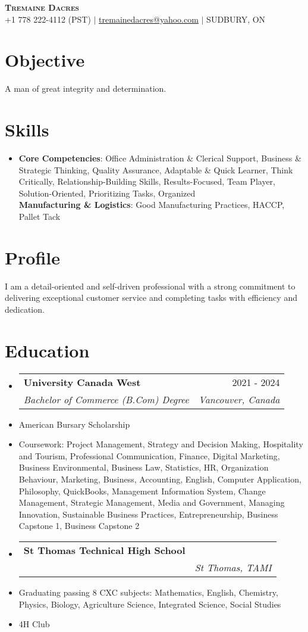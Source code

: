 \documentclass[letterpaper,11pt]{article}
\makeatletter
\newcommand{\resumeItem}[1]{
\item\small{
{#1 \vspace{-2pt}}
}
}
\newcommand{\resumeSubheading}[4]{
\vspace{-2pt}\item
\begin{tabular*}{0.97\textwidth}[t]{l@{\extracolsep{\fill}}r}
\textbf{#1} & #2 \\
\textit{\small#3} & \textit{\small #4} \\
\end{tabular*}\vspace{-7pt}
}
\newcommand{\resumeSubHeadingListStart}{\begin{itemize}[leftmargin=0.15in, label={}]}
\newcommand{\resumeSubHeadingListEnd}{\end{itemize}}
\makeatother
\begin{document}
\begin{center}
\textbf{\Huge \scshape Tremaine Dacres} \\ \vspace{1pt}
\small +1 778 222-4112 (PST) $|$ \href{mailto:tremainedacres@yahoo.com}{\underline{tremainedacres@yahoo.com}} $|$ SUDBURY, ON
\end{center}


\section{Objective}
A man of great integrity and determination.

\section{Skills}
\begin{itemize}[leftmargin=0.15in, label={}]
\item{
\textbf{Core Competencies}{: Office Administration \& Clerical Support, Business \& Strategic Thinking, Quality Assurance, Adaptable \& Quick Learner, Think Critically, Relationship-Building Skills, Results-Focused, Team Player, Solution-Oriented, Prioritizing Tasks, Organized} \\
\textbf{Manufacturing \& Logistics}{: Good Manufacturing Practices, HACCP, Pallet Tack}
} \\
\end{itemize}

\section{Profile}
I am a detail-oriented and self-driven professional with a strong commitment to delivering exceptional customer service and completing tasks with efficiency and dedication.

\section{Education}
\resumeSubHeadingListStart
\resumeSubheading{University Canada West}{2021 - 2024}{Bachelor of Commerce (B.Com) Degree}{Vancouver, Canada}
\resumeItem{American Bursary Scholarship}
\resumeItem{Coursework: Project Management, Strategy and Decision Making, Hospitality and Tourism, Professional Communication, Finance, Digital Marketing, Business Environmental, Business Law, Statistics, HR, Organization Behaviour, Marketing, Business, Accounting, English, Computer Application, Philosophy, QuickBooks, Management Information System, Change Management, Strategic Management, Media and Government, Managing Innovation, Sustainable Business Practices, Entrepreneurship, Business Capstone 1, Business Capstone 2}
\resumeSubheading{St Thomas Technical High School}{}{}{St Thomas, TAMI}
\resumeItem{Graduating passing 8 CXC subjects: Mathematics, English, Chemistry, Physics, Biology, Agriculture Science, Integrated Science, Social Studies}
\resumeItem{4H Club}
\resumeSubHeadingListEnd
\end{document}
